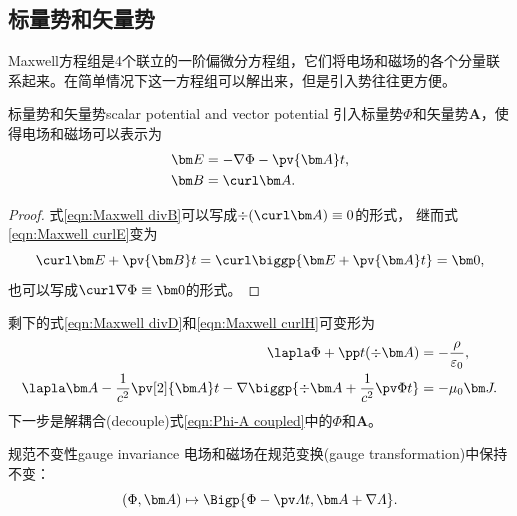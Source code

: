 \subsection{标量势和矢量势}

Maxwell方程组是4个联立的一阶偏微分方程组，它们将电场和磁场的各个分量联系起来。在简单情况下这一方程组可以解出来，但是引入势往往更方便。

\begin{definition}
    {标量势和矢量势}{scalar potential and vector potential}
    引入标量势$\Phi$和矢量势$\bm A$，使得电场和磁场可以表示为
    \begin{subequations}
        \begin{align}
            \label{eqn:-nablaPhi-pApt}
            \bm E&=-\nabla\Phi-\pv{\bm A}t,\\
            \label{eqn:curlA}
            \bm B&=\curl\bm A.
        \end{align}
    \end{subequations}
\end{definition}

\begin{proof}
    式\eqref{eqn:Maxwell divB}可以写成$\div(\curl\bm A)\equiv 0$的形式，
    继而式\eqref{eqn:Maxwell curlE}变为 
    \[
        \curl\bm E+\pv{\bm B}t=\curl\biggp{\bm E+\pv{\bm A}t}=\bm 0,
    \]
    也可以写成$\curl\nabla\Phi\equiv\bm 0$的形式。
\end{proof}

\begin{corollary}
    剩下的式\eqref{eqn:Maxwell divD}和\eqref{eqn:Maxwell curlH}可变形为%
    \begin{subequations}
        \label{eqn:Phi-A coupled}
        \begin{align}
            \label{eqn:Phi-A coupled a}
            \lapla\Phi+\pp t(\div\bm A)&=-\frac\rho{\varepsilon_0},\\
            \label{eqn:Phi-A coupled b}
            \lapla\bm A-\frac1{c^2}\pv[2]{\bm A}t-\nabla\biggp{\div\bm A+\frac1{c^2}\pv\Phi t}&=-\mu_0\bm J.
        \end{align}
    \end{subequations}
    下一步是解耦合(decouple)式\eqref{eqn:Phi-A coupled}中的$\Phi$和$\bm A$。
\end{corollary}

\begin{theorem}
    {规范不变性}{gauge invariance}
    电场和磁场在规范变换(gauge transformation)中保持不变：
    \begin{equation}
        (\Phi,\bm A)\mapsto\Bigp{\Phi-\pv\varLambda t,\bm A+\nabla\varLambda}.
    \end{equation}
\end{theorem}

